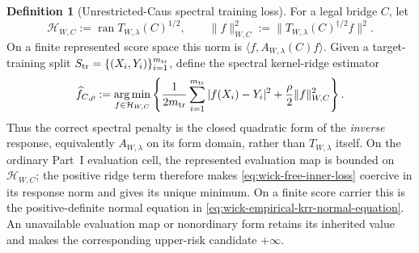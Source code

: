 \documentclass[11pt]{article}
\numberwithin{section}{part}
\theoremstyle{plain}
\theoremstyle{definition}
\newtheorem{definition}[definition]{Definition}
\theoremstyle{remark}
\begin{document}
\begin{definition}[Unrestricted-Caus spectral training loss]
\label{def:wick-free-caus-training-loss}
For a legal bridge \(C\), let
\[
 \mathcal H_{W,C}:=\operatorname{ran}T_{W,\lambda}(C)^{1/2},
 \qquad
 \|f\|_{W,C}^2
 :=\|T_{W,\lambda}(C)^{\dagger/2}f\|^2.
\]
On a finite represented score space this norm is
\(\langle f,A_{W,\lambda}(C)f\rangle\).  Given a target-training split
\(S_{\rm tr}=\{(X_i,Y_i)\}_{i=1}^{m_{\rm tr}}\), define the spectral
kernel-ridge estimator
\begin{equation}
 \label{eq:wick-free-inner-loss}
 \widehat f_{C,\rho}
 :=\operatorname*{arg\,min}_{f\in\mathcal H_{W,C}}
 \left\{
 \frac1{2m_{\rm tr}}\sum_{i=1}^{m_{\rm tr}}|f(X_i)-Y_i|^2
 +\frac\rho2\|f\|_{W,C}^2
 \right\}.
\end{equation}
Thus the correct spectral penalty is the closed quadratic form of the
\emph{inverse} response, equivalently \(A_{W,\lambda}\) on its form domain,
rather than \(T_{W,\lambda}\) itself.
On the ordinary Part~I evaluation cell, the represented evaluation map is
bounded on \(\mathcal H_{W,C}\); the positive ridge term therefore makes
\eqref{eq:wick-free-inner-loss} coercive in its response norm and gives its
unique minimum.  On a finite score carrier this is the positive-definite
normal equation in \eqref{eq:wick-empirical-krr-normal-equation}.  An
unavailable evaluation map or nonordinary form retains its inherited value
and makes the corresponding upper-risk candidate \(+\infty\).


\end{definition}
\end{document}
